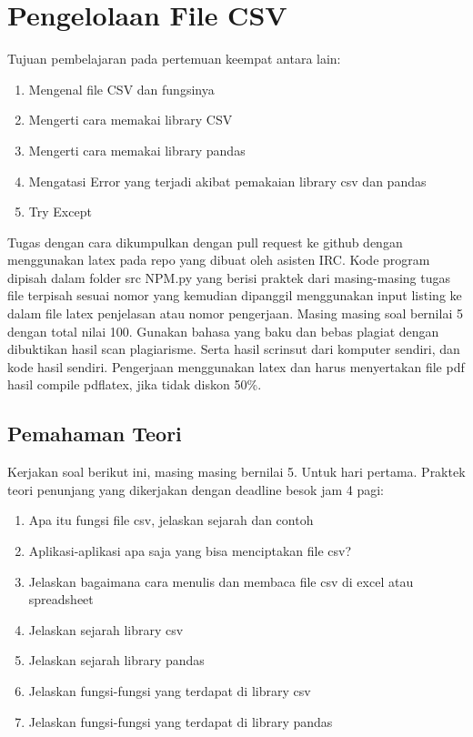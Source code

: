 \chapter{Pengelolaan File CSV}

Tujuan pembelajaran pada pertemuan keempat antara lain:
\begin{enumerate}
\item
Mengenal file CSV dan fungsinya 
\item
Mengerti cara memakai library CSV
\item
Mengerti cara memakai library pandas
\item
Mengatasi Error yang terjadi akibat pemakaian library csv dan pandas
\item
Try Except
\end{enumerate}
Tugas dengan cara dikumpulkan dengan pull request ke github dengan menggunakan latex pada repo yang dibuat oleh asisten IRC. Kode program dipisah dalam folder src NPM.py yang berisi praktek dari masing-masing tugas file terpisah sesuai nomor yang kemudian dipanggil menggunakan input listing ke dalam file latex penjelasan atau nomor pengerjaan. Masing masing soal bernilai 5 dengan total nilai 100. Gunakan bahasa yang baku dan bebas plagiat dengan dibuktikan hasil scan plagiarisme. Serta hasil scrinsut dari komputer sendiri, dan kode hasil sendiri. Pengerjaan menggunakan latex dan harus menyertakan file pdf hasil compile pdflatex, jika tidak diskon 50\%.


\section{Pemahaman Teori}
Kerjakan soal berikut ini, masing masing bernilai 5. Untuk hari pertama.
Praktek teori penunjang yang dikerjakan dengan deadline besok jam 4 pagi:
\begin{enumerate}
\item
Apa itu fungsi file csv, jelaskan sejarah dan contoh
\item
Aplikasi-aplikasi apa saja yang bisa menciptakan file csv?
\item
Jelaskan bagaimana cara menulis dan membaca file csv di excel atau spreadsheet
\item
Jelaskan sejarah library csv
\item
Jelaskan sejarah library pandas
\item
Jelaskan fungsi-fungsi yang terdapat di library csv
\item
Jelaskan fungsi-fungsi yang terdapat di library pandas
\end{enumerate}

